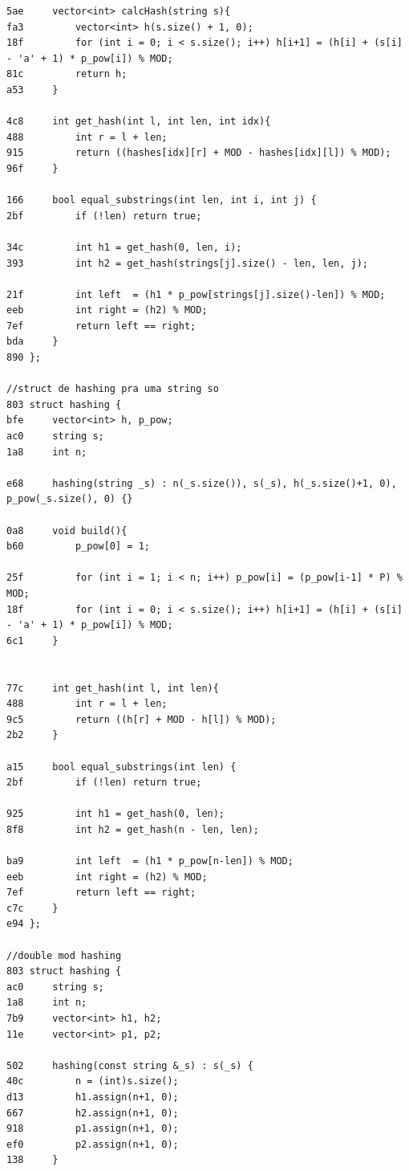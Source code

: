 \documentclass[11pt, a4paper, twoside]{article}
\begin{document}
\begin{lstlisting}
5ae     vector<int> calcHash(string s){
fa3         vector<int> h(s.size() + 1, 0); 
18f         for (int i = 0; i < s.size(); i++) h[i+1] = (h[i] + (s[i] - 'a' + 1) * p_pow[i]) % MOD;
81c         return h;
a53     }
        
4c8     int get_hash(int l, int len, int idx){
488         int r = l + len;
915         return ((hashes[idx][r] + MOD - hashes[idx][l]) % MOD);
96f     }
    
166     bool equal_substrings(int len, int i, int j) {
2bf         if (!len) return true;
    
34c         int h1 = get_hash(0, len, i);
393         int h2 = get_hash(strings[j].size() - len, len, j);
    
21f         int left  = (h1 * p_pow[strings[j].size()-len]) % MOD;
eeb         int right = (h2) % MOD;
7ef         return left == right;
bda     }
890 };

//struct de hashing pra uma string so
803 struct hashing {
bfe     vector<int> h, p_pow;
ac0     string s;
1a8     int n;
        
e68     hashing(string _s) : n(_s.size()), s(_s), h(_s.size()+1, 0), p_pow(_s.size(), 0) {} 
    
0a8     void build(){
b60         p_pow[0] = 1; 
    
25f         for (int i = 1; i < n; i++) p_pow[i] = (p_pow[i-1] * P) % MOD;
18f         for (int i = 0; i < s.size(); i++) h[i+1] = (h[i] + (s[i] - 'a' + 1) * p_pow[i]) % MOD;
6c1     }
        
    
77c     int get_hash(int l, int len){
488         int r = l + len;
9c5         return ((h[r] + MOD - h[l]) % MOD);
2b2     }
    
a15     bool equal_substrings(int len) {
2bf         if (!len) return true;
    
925         int h1 = get_hash(0, len);
8f8         int h2 = get_hash(n - len, len);
    
ba9         int left  = (h1 * p_pow[n-len]) % MOD;
eeb         int right = (h2) % MOD;
7ef         return left == right;
c7c     }
e94 };

//double mod hashing
803 struct hashing {
ac0     string s;
1a8     int n;
7b9     vector<int> h1, h2;
11e     vector<int> p1, p2;
    
502     hashing(const string &_s) : s(_s) {
40c         n = (int)s.size();
d13         h1.assign(n+1, 0);
667         h2.assign(n+1, 0);
918         p1.assign(n+1, 0);
ef0         p2.assign(n+1, 0);
138     }
    

\end{lstlisting}
\end{document}
